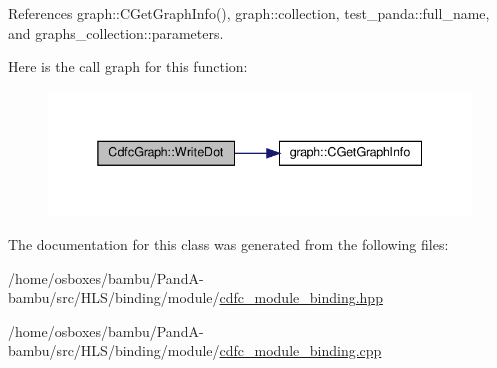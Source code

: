 References graph\+::\+C\+Get\+Graph\+Info(), graph\+::collection, test\+\_\+panda\+::full\+\_\+name, and graphs\+\_\+collection\+::parameters.

Here is the call graph for this function\+:
\nopagebreak
\begin{figure}[H]
\begin{center}
\leavevmode
\includegraphics[width=338pt]{d9/da3/classCdfcGraph_a018d7ee1154139dc49ea1bc823edea61_cgraph}
\end{center}
\end{figure}


The documentation for this class was generated from the following files\+:\begin{DoxyCompactItemize}
\item 
/home/osboxes/bambu/\+Pand\+A-\/bambu/src/\+H\+L\+S/binding/module/\hyperlink{cdfc__module__binding_8hpp}{cdfc\+\_\+module\+\_\+binding.\+hpp}\item 
/home/osboxes/bambu/\+Pand\+A-\/bambu/src/\+H\+L\+S/binding/module/\hyperlink{cdfc__module__binding_8cpp}{cdfc\+\_\+module\+\_\+binding.\+cpp}\end{DoxyCompactItemize}
